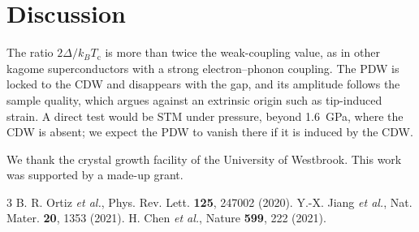 \documentclass[aps,prl,twocolumn,superscriptaddress,showpacs]{revtex4-2}
\newcommand{\Tc}{T_\mathrm{c}}
\begin{document}
\section{Discussion}

The ratio $2\Delta/k_B\Tc$ is more than twice the weak-coupling value, as in other kagome superconductors with a strong electron--phonon coupling. The PDW is locked to the CDW and disappears with the gap, and its amplitude follows the sample quality, which argues against an extrinsic origin such as tip-induced strain. A direct test would be STM under pressure, beyond \SI{1.6}{\giga\pascal}, where the CDW is absent; we expect the PDW to vanish there if it is induced by the CDW.

\begin{acknowledgments}
We thank the crystal growth facility of the University of Westbrook. This work was supported by a made-up grant.
\end{acknowledgments}

\begin{thebibliography}{3}
 B. R. Ortiz \textit{et al.}, Phys. Rev. Lett. \textbf{125}, 247002 (2020).
 Y.-X. Jiang \textit{et al.}, Nat. Mater. \textbf{20}, 1353 (2021).
 H. Chen \textit{et al.}, Nature \textbf{599}, 222 (2021).
\end{thebibliography}
\end{document}
